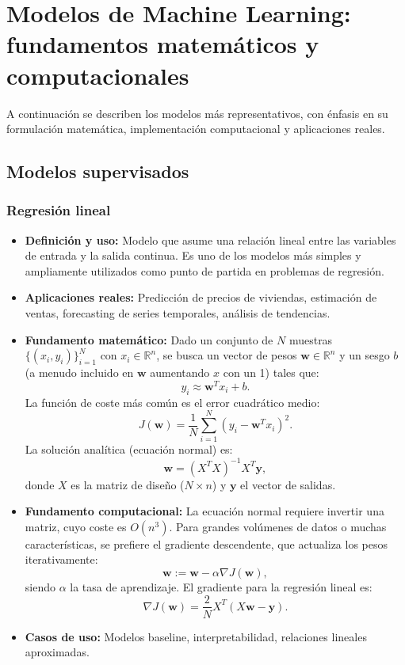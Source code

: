 \documentclass[12pt,a4paper,openany,oneside]{book}
\begin{document}
\section{Modelos de Machine Learning: fundamentos matemáticos y computacionales}
A continuación se describen los modelos más representativos, con énfasis en su formulación matemática, implementación computacional y aplicaciones reales.

\subsection{Modelos supervisados}

\subsubsection{Regresión lineal}
\begin{itemize}
    \item \textbf{Definición y uso:} Modelo que asume una relación lineal entre las variables de entrada y la salida continua. Es uno de los modelos más simples y ampliamente utilizados como punto de partida en problemas de regresión.
    \item \textbf{Aplicaciones reales:} Predicción de precios de viviendas, estimación de ventas, forecasting de series temporales, análisis de tendencias.
    \item \textbf{Fundamento matemático:} Dado un conjunto de \(N\) muestras \(\{(x_i, y_i)\}_{i=1}^N\) con \(x_i \in \mathbb{R}^n\), se busca un vector de pesos \(\mathbf{w} \in \mathbb{R}^n\) y un sesgo \(b\) (a menudo incluido en \(\mathbf{w}\) aumentando \(x\) con un 1) tales que:
    \[
    y_i \approx \mathbf{w}^T x_i + b.
    \]
    La función de coste más común es el error cuadrático medio:
    \[
    J(\mathbf{w}) = \frac{1}{N} \sum_{i=1}^N (y_i - \mathbf{w}^T x_i)^2.
    \]
    La solución analítica (ecuación normal) es:
    \[
    \mathbf{w} = (X^T X)^{-1} X^T \mathbf{y},
    \]
    donde \(X\) es la matriz de diseño (\(N \times n\)) y \(\mathbf{y}\) el vector de salidas.
    \item \textbf{Fundamento computacional:} La ecuación normal requiere invertir una matriz, cuyo coste es \(O(n^3)\). Para grandes volúmenes de datos o muchas características, se prefiere el gradiente descendente, que actualiza los pesos iterativamente:
    \[
    \mathbf{w} := \mathbf{w} - \alpha \nabla J(\mathbf{w}),
    \]
    siendo \(\alpha\) la tasa de aprendizaje. El gradiente para la regresión lineal es:
    \[
    \nabla J(\mathbf{w}) = \frac{2}{N} X^T (X\mathbf{w} - \mathbf{y}).
    \]
    \item \textbf{Casos de uso:} Modelos baseline, interpretabilidad, relaciones lineales aproximadas.
\end{itemize}
\end{document}
